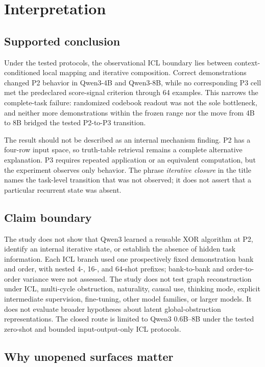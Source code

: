 \documentclass[10pt,a4paper]{article}
\begin{document}
\section{Interpretation}

\subsection{Supported conclusion}

Under the tested protocols, the observational ICL boundary lies between context-conditioned local mapping and iterative composition. Correct demonstrations changed P2 behavior in Qwen3-4B and Qwen3-8B, while no corresponding P3 cell met the predeclared score-signal criterion through 64 examples. This narrows the complete-task failure: randomized codebook readout was not the sole bottleneck, and neither more demonstrations within the frozen range nor the move from 4B to 8B bridged the tested P2-to-P3 transition.

The result should not be described as an internal mechanism finding. P2 has a four-row input space, so truth-table retrieval remains a complete alternative explanation. P3 requires repeated application or an equivalent computation, but the experiment observes only behavior. The phrase \emph{iterative closure} in the title names the task-level transition that was not observed; it does not assert that a particular recurrent state was absent.

\subsection{Claim boundary}

The study does not show that Qwen3 learned a reusable XOR algorithm at P2, identify an internal iterative state, or establish the absence of hidden task information. Each ICL branch used one prospectively fixed demonstration bank and order, with nested 4-, 16-, and 64-shot prefixes; bank-to-bank and order-to-order variance were not assessed. The study does not test graph reconstruction under ICL, multi-cycle obstruction, naturality, causal use, thinking mode, explicit intermediate supervision, fine-tuning, other model families, or larger models. It does not evaluate broader hypotheses about latent global-obstruction representations. The closed route is limited to Qwen3 0.6B--8B under the tested zero-shot and bounded input-output-only ICL protocols.

\subsection{Why unopened surfaces matter}
\end{document}
